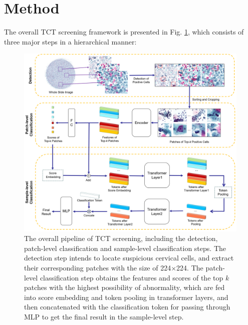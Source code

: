 \section{Method}\label{sec:method}

The overall TCT screening framework is presented in Fig. \ref{fig:overview}, which consists of three major steps in a hierarchical manner: 

\begin{figure}[ht]
    \centering  
    \includegraphics[width=\textwidth]{figures/pipeline.png}
    \caption{The overall pipeline of TCT screening, including the detection, patch-level classification and sample-level classification steps. The detection step intends to locate suspicious cervical cells, and extract their corresponding patches with the size of 224$\times$224. The patch-level classification step obtains the features and scores of the top $k$ patches with the highest possibility of abnormality, which are fed into score embedding and token pooling in transformer layers, and then concatenated with the classification token for passing through MLP to get the final result in the sample-level step.}
    \label{fig:overview}
\end{figure}


